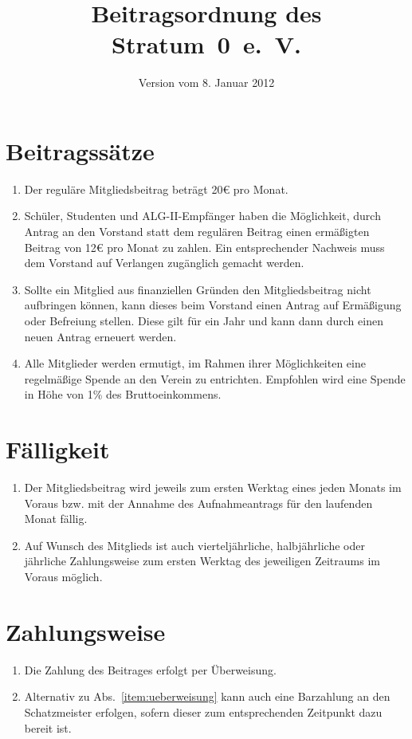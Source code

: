 \documentclass[a4paper,12pt]{scrartcl}
\title{Beitragsordnung des Stratum~0~e.~V.}
\date{Version vom 8. Januar 2012}
\begin{document}
\maketitle

\section{Beitragssätze}
\begin{enumerate}
  \item Der reguläre Mitgliedsbeitrag beträgt 20€ pro Monat.
  \item Schüler, Studenten und ALG-II-Empfänger haben die Möglichkeit, durch
    Antrag an den Vorstand statt dem regulären Beitrag einen ermäßigten Beitrag
    von 12€ pro Monat zu zahlen. Ein entsprechender Nachweis muss dem Vorstand
    auf Verlangen zugänglich gemacht werden.
  \item Sollte ein Mitglied aus finanziellen Gründen den Mitgliedsbeitrag nicht
    aufbringen können, kann dieses beim Vorstand einen Antrag auf Ermäßigung
    oder Befreiung stellen. Diese gilt für ein Jahr und kann dann durch einen
    neuen Antrag erneuert werden.
  \item Alle Mitglieder werden ermutigt, im Rahmen ihrer Möglichkeiten eine
    regelmäßige Spende an den Verein zu entrichten. Empfohlen wird eine Spende
    in Höhe von 1\% des Bruttoeinkommens.
\end{enumerate}

\section{Fälligkeit}
\begin{enumerate}
  \item Der Mitgliedsbeitrag wird jeweils zum ersten Werktag eines jeden Monats
    im Voraus bzw. mit der Annahme des Aufnahmeantrags für den laufenden Monat
    fällig.
  \item Auf Wunsch des Mitglieds ist auch vierteljährliche, halbjährliche oder
    jährliche Zahlungsweise zum ersten Werktag des jeweiligen Zeitraums im
    Voraus möglich.
\end{enumerate}

\section{Zahlungsweise}
\begin{enumerate}
  \item\label{item:ueberweisung} Die Zahlung des Beitrages erfolgt per Überweisung.
  \item Alternativ zu Abs.~\ref{item:ueberweisung} kann auch eine Barzahlung an den
    Schatzmeister erfolgen, sofern dieser zum entsprechenden Zeitpunkt dazu
    bereit ist.
\end{enumerate}
\end{document}
